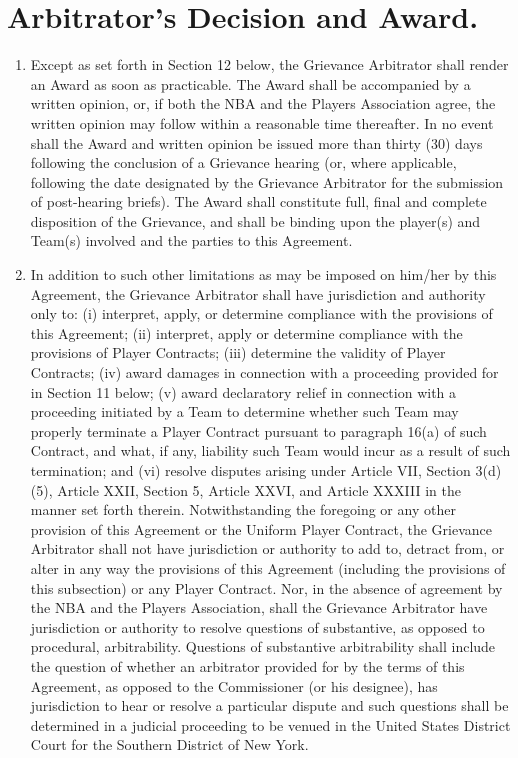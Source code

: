 \documentclass[
]{book}
\providecommand{\tightlist}{%
  \setlength{\itemsep}{0pt}\setlength{\parskip}{0pt}}
\begin{document}
\hypertarget{arbitrators-decision-and-award.}{%
\section{Arbitrator's Decision and Award.}\label{arbitrators-decision-and-award.}}

\begin{enumerate}
\def\labelenumi{(\alph{enumi})}
\tightlist
\item
  Except as set forth in Section 12 below, the Grievance Arbitrator shall render an Award as soon as practicable. The Award shall be accompanied by a written opinion, or, if both the NBA and the Players Association agree, the written opinion may follow within a reasonable time thereafter. In no event shall the Award and written opinion be issued more than thirty (30) days following the conclusion of a Grievance hearing (or, where applicable, following the date designated by the Grievance Arbitrator for the submission of post-hearing briefs). The Award shall constitute full, final and complete disposition of the Grievance, and shall be binding upon the player(s) and Team(s) involved and the parties to this Agreement.
\item
  In addition to such other limitations as may be imposed on him/her by this Agreement, the Grievance Arbitrator shall have jurisdiction and authority only to: (i) interpret, apply, or determine compliance with the provisions of this Agreement; (ii) interpret, apply or determine compliance with the provisions of Player Contracts; (iii) determine the validity of Player Contracts; (iv) award damages in connection with a proceeding provided for in Section 11 below; (v) award declaratory relief in connection with a proceeding initiated by a Team to determine whether such Team may properly terminate a Player Contract pursuant to paragraph 16(a) of such Contract, and what, if any, liability such Team would incur as a result of such termination; and (vi) resolve disputes arising under Article VII, Section 3(d)(5), Article XXII, Section 5, Article XXVI, and Article XXXIII in the manner set forth therein. Notwithstanding the foregoing or any other provision of this Agreement or the Uniform Player Contract, the Grievance Arbitrator shall not have jurisdiction or authority to add to, detract from, or alter in any way the provisions of this Agreement (including the provisions of this subsection) or any Player Contract. Nor, in the absence of agreement by the NBA and the Players Association, shall the Grievance Arbitrator have jurisdiction or authority to resolve questions of substantive, as opposed to procedural, arbitrability. Questions of substantive arbitrability shall include the question of whether an arbitrator provided for by the terms of this Agreement, as opposed to the Commissioner (or his designee), has jurisdiction to hear or resolve a particular dispute and such questions shall be determined in a judicial proceeding to be venued in the United States District Court for the Southern District of New York.
\end{enumerate}
\end{document}
